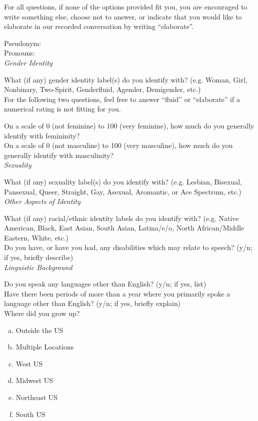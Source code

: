 \documentclass[12pt,twoside]{reedthesis}
\begin{document}
For all questions, if none of the options provided fit you, you are encouraged to write something else, choose not to answer, or indicate that you would like to elaborate in our recorded conversation by writing “elaborate”.

{\parindent0pt
Pseudonym: \\
Pronouns: \\

\textit{Gender Identity}

What (if any) gender identity label(s) do you identify with? (e.g. Woman, Girl, Nonbinary, Two-Spirit, Genderfluid, Agender, Demigender, etc.) \\

For the following two questions, feel free to answer “fluid” or “elaborate” if a numerical rating is not fitting for you.

On a scale of 0 (not feminine) to 100 (very feminine), how much do you generally identify with femininity? \\

On a scale of 0 (not masculine) to 100 (very masculine), how much do you generally identify with masculinity? \\

\textit{Sexuality}

What (if any) sexuality label(s) do you identify with? (e.g. Lesbian, Bisexual, Pansexual, Queer, Straight, Gay, Asexual, Aromantic, or Ace Spectrum, etc.) \\


\textit{Other Aspects of Identity}

What (if any) racial/ethnic identity labels do you identify with? (e.g. Native American, Black, East Asian, South Asian, Latina/e/o, North African/Middle Eastern, White, etc.) \\

Do you have, or have you had, any disabilities which may relate to speech? (y/n; if yes, briefly describe) \\

\textit{Linguistic Background}

Do you speak any languages other than English? (y/n; if yes, list) \\

Have there been periods of more than a year where you primarily spoke a language other than English? (y/n; if yes, briefly explain) \\

Where did you grow up?
\begin{enumerate}[(a)]
	\item Outside the US
	\item Multiple Locations
	\item West US
	\item Midwest US
	\item Northeast US
	\item South US
\end{enumerate}


}
\end{document}
